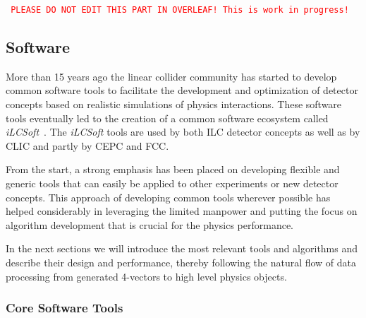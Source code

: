 %
%
\newcommand{\fix}[1]{\textcolor{red}{\texttt{#1}}} %

\newcommand{\CPP}{C\nolinebreak\hspace{-.05em}\raisebox{.4ex}{\tiny\bf +}\nolinebreak\hspace{-.10em}\raisebox{.4ex}{\tiny\bf +}}



\fix{ PLEASE DO NOT EDIT THIS PART IN OVERLEAF! This is work in progress!}



\subsection{Software}

More than 15 years ago the linear collider community has started to develop common software
tools to facilitate the development and optimization of detector concepts based on realistic
simulations of physics interactions. These software tools eventually led to the creation of
a common software ecosystem called \emph{iLCSoft}~\cite{bib:ilcsoft}.
The \emph{iLCSoft} tools are used by both ILC detector concepts as well as by CLIC
and partly by CEPC and FCC.

From the start, a strong emphasis has been placed on developing flexible and generic tools
that can easily be applied to other experiments or new detector concepts. 
This approach of developing common tools wherever possible has helped considerably in
leveraging the limited manpower and putting the focus on algorithm development that
is crucial for the physics performance. 

In the next sections we will introduce the most relevant tools and algorithms and
describe their design and performance, thereby following the natural flow of data processing
from generated 4-vectors to high level physics objects.


\subsubsection{Core Software Tools}

